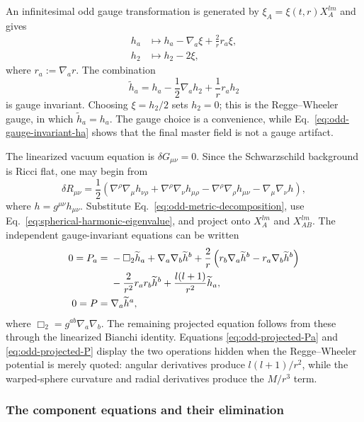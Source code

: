 An infinitesimal odd gauge transformation is generated by
$\xi_A=\xi(t,r)X_A^{lm}$ and gives
\begin{align}
  h_a&\longmapsto h_a-\nabla_a\xi+\frac{2}{r}r_a\xi,
  \label{eq:odd-gauge-ha}\\
  h_2&\longmapsto h_2-2\xi,
  \label{eq:odd-gauge-h2}
\end{align}
where $r_a:=\nabla_a r$.  The combination
\begin{equation}
  \widetilde h_a
  =h_a-\frac{1}{2}\nabla_a h_2+\frac{1}{r}r_a h_2
  \label{eq:odd-gauge-invariant-ha}
\end{equation}
is gauge invariant.  Choosing $\xi=h_2/2$ sets $h_2=0$; this is the
Regge--Wheeler gauge, in which $\widetilde h_a=h_a$.  The gauge choice is a
convenience, while Eq.~\eqref{eq:odd-gauge-invariant-ha} shows that the final
master field is not a gauge artifact.

The linearized vacuum equation is $\delta G_{\mu\nu}=0$.  Since the
Schwarzschild background is Ricci flat, one may begin from
\begin{equation}
  \delta R_{\mu\nu}
  =\frac{1}{2}\left(
  \nabla^\rho\nabla_\mu h_{\nu\rho}
  +\nabla^\rho\nabla_\nu h_{\mu\rho}
  -\nabla^\rho\nabla_\rho h_{\mu\nu}
  -\nabla_\mu\nabla_\nu h
  \right),
  \label{eq:linearized-ricci}
\end{equation}
where $h=g^{\mu\nu}h_{\mu\nu}$.  Substitute
Eq.~\eqref{eq:odd-metric-decomposition}, use
Eq.~\eqref{eq:spherical-harmonic-eigenvalue}, and project onto
$X_A^{lm}$ and $X_{AB}^{lm}$.  The independent gauge-invariant equations can
be written
\begin{align}
  0=P_a={}&-\Box_2\widetilde h_a
  +\nabla_a\nabla_b\widetilde h^b
  +\frac{2}{r}\left(
  r_b\nabla_a\widetilde h^b-r_a\nabla_b\widetilde h^b\right)
  \notag\\
  &-\frac{2}{r^2}r_ar_b\widetilde h^b
  +\frac{l(l+1)}{r^2}\widetilde h_a,
  \label{eq:odd-projected-Pa}\\
  0=P={}&\nabla_a\widetilde h^a,
  \label{eq:odd-projected-P}
\end{align}
where $\Box_2=g^{ab}\nabla_a\nabla_b$.  The remaining projected equation
follows from these through the linearized Bianchi identity.  Equations
\eqref{eq:odd-projected-Pa} and \eqref{eq:odd-projected-P} display the two
operations hidden when the Regge--Wheeler potential is merely quoted:
angular derivatives produce $l(l+1)/r^2$, while the warped-sphere curvature
and radial derivatives produce the $M/r^3$ term.

\subsubsection*{The component equations and their elimination}

